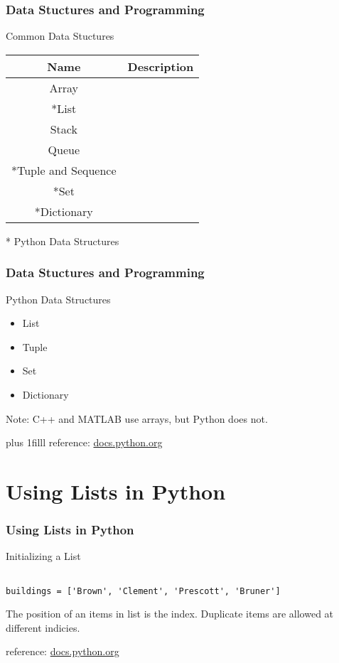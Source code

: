 \documentclass[fleqn]{beamer} %
\newcommand{\sectiontitleI}{Data Stuctures and Programming} %
\newcommand{\sectiontitleII}{Using Lists in Python}
\newcommand{\btVFill}{\vskip0pt plus 1filll}
\begin{document}
	\begin{frame} \small
		\frametitle{\sectiontitleI}

		Common Data Stuctures 
		\renewcommand{\arraystretch}{1.5}
		\begin{tabular}{|c|c|} \hline
			Name& Description \hspace{50mm} \\ \hline
			Array&  \\ \hline
			*List&  \\ \hline
			Stack&  \\ \hline
			Queue&  \\ \hline
			*Tuple and Sequence&  \\ \hline
			*Set&  \\ \hline
			*Dictionary&  \\ \hline
		\end{tabular}

		* Python Data Structures
	\end{frame}
		

	\begin{frame} \small
		\frametitle{\sectiontitleI}

		Python Data Structures

		\begin{itemize}
			\item List
			\item Tuple
			\item Set
			\item Dictionary
		\end{itemize}

		Note: C++ and MATLAB use arrays, but Python does not.



		\btVFill
		\tiny{reference: \href{https://docs.python.org/3/tutorial/datastructures.html\#}{docs.python.org} } 
	\end{frame}


\section{\sectiontitleII}

	\begin{frame}[label=sectionII, containsverbatim] \small
		\frametitle{\sectiontitleII}
			
		Initializing a List

		\begin{lstlisting}

buildings = ['Brown', 'Clement', 'Prescott', 'Bruner']

		\end{lstlisting}

		The position of an items in list is the index. Duplicate items are allowed at different indicies. 

		\tiny{reference: \href{https://docs.python.org/3/tutorial/introduction.html\#lists}{docs.python.org}}
	
	\end{frame}
\end{document}
